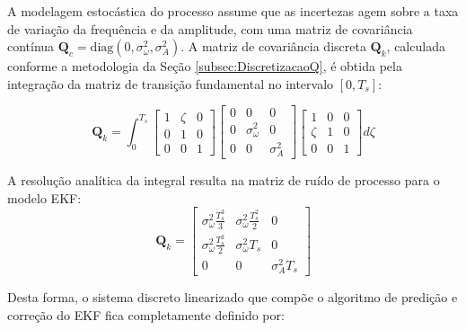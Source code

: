 \documentclass[a4paper,12pt]{article}
\begin{document}
A modelagem estocástica do processo assume que as incertezas agem sobre a taxa de variação da frequência e da amplitude, com uma matriz de covariância contínua $\mathbf{Q}_c = \text{diag}(0, \sigma_{\omega}^2, \sigma_{A}^2)$. A matriz de covariância discreta $\mathbf{Q}_k$, calculada conforme a metodologia da Seção \ref{subsec:DiscretizacaoQ}, é obtida pela integração da matriz de transição fundamental no intervalo $[0, T_s]$:

\begin{equation}
    \mathbf{Q}_k = \int_{0}^{T_s} \begin{bmatrix} 1 & \zeta & 0 \\ 0 & 1 & 0 \\ 0 & 0 & 1 \end{bmatrix} \begin{bmatrix} 0 & 0 & 0 \\ 0 & \sigma_{\omega}^2 & 0 \\ 0 & 0 & \sigma_{A}^2 \end{bmatrix} \begin{bmatrix} 1 & 0 & 0 \\ \zeta & 1 & 0 \\ 0 & 0 & 1 \end{bmatrix} d\zeta
\end{equation}

A resolução analítica da integral resulta na matriz de ruído de processo para o modelo EKF:
\begin{equation}
    \mathbf{Q}_k = \begin{bmatrix} 
        \sigma_{\omega}^2 \frac{T_s^3}{3} & \sigma_{\omega}^2 \frac{T_s^2}{2} & 0 \\ 
        \sigma_{\omega}^2 \frac{T_s^2}{2} & \sigma_{\omega}^2 T_s & 0 \\ 
        0 & 0 & \sigma_{A}^2 T_s 
    \end{bmatrix}
    \label{eq:mod2_Qk_final}
\end{equation}

Desta forma, o sistema discreto linearizado que compõe o algoritmo de predição e correção do EKF fica completamente definido por:
\end{document}
